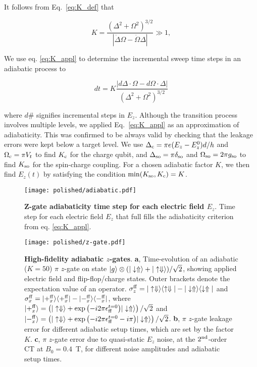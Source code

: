 It follows from Eq.~\ref{eq:K_def} that

\begin{equation} \label{eq:K_appl}
K=\frac{\left(\Delta^2+\Omega^2\right)^{3/2}}{|\dot{\Delta}\Omega-\dot{\Omega}\Delta|}\gg1,
\end{equation}

We use eq. \eqref{eq:K_appl} to determine the incremental sweep time steps in an adiabatic process to 

\begin{equation} \label{eq:dtK}
dt=K\frac{|d\Delta\cdot\Omega-d\Omega\cdot\Delta|}{\left(\Delta^2+\Omega^2\right)^{3/2}}
\end{equation}

where $d\#$ signifies incremental steps in $E_z$.
Although the transition process involves multiple levels, we applied Eq.~\ref{eq:K_appl} as an approximation of adiabaticity. This was confirmed to be always valid by checking that the leakage errors were kept below a target level.
We use $\Delta_{\rm c}=\pi e(E_z - E_z^0)d/h$ and $\Omega_{\rm c}=\pi V_t$ to find $K_{\rm c}$ for the charge qubit, and $\Delta_{\rm so}=\pi\delta_{\rm so}$ and $\Omega_{\rm so}=2\pi g_{\rm so}$ to find $K_{\rm so}$ for the spin-charge coupling.
 For a chosen adiabatic factor $K$, we then find $E_z(t)$ by satisfying the condition $\min(K_{\rm so},K_{\rm c})=K$.

\begin{figure}[h]
	\centering
	\texttt{[image: polished/adiabatic.pdf]}
	\label{fig:z-gate_K}
	\caption[Z-gate adiabaticity time step for each electric field $E_z$]{\textbf{Z-gate adiabaticity time step for each electric field $E_z$}. Time step for each electric field $E_z$ that full fills the adiabaticity criterion from eq. \eqref{eq:K_appl}.}
\end{figure}

\begin{figure}[h]
	\centering
	\texttt{[image: polished/z-gate.pdf]}
	\caption[High-fidelity adiabatic $z$-gates]{\textbf{High-fidelity adiabatic $z$-gates}.
		\textbf{a}, Time-evolution of an adiabatic  ($K=50$) $\pi$ $z$-gate on state $|g\rangle\otimes(|\downarrow\Uparrow\rangle+|\uparrow\Downarrow\rangle)/\sqrt{2}$, showing applied electric field and flip-flop/charge states. Outer brackets denote the expectation value of an operator. $\sigma_z^{\rm ff}=|\uparrow\Downarrow\rangle\langle \uparrow\Downarrow|-|\downarrow\Uparrow\rangle\langle \downarrow\Uparrow|$ and $\sigma_x^{\rm ff}=|+_x^{\rm ff}\rangle\langle +_x^{\rm ff}|-|-_x^{\rm ff}\rangle\langle -_x^{\rm ff}|$, where $|+_x^{\rm ff}\rangle=\left(|\uparrow\Downarrow\rangle+\exp{\left(-i2\pi\epsilon_{\rm ff}^{t=0}\right)}|\downarrow\Uparrow\rangle\right)/\sqrt{2}$ and $|-_x^{\rm ff}\rangle=\left(|\uparrow\Downarrow\rangle+\exp{\left(-i2\pi\epsilon_{\rm ff}^{t=0}-i\pi\right)}|\downarrow\Uparrow\rangle\right)/\sqrt{2}$. 
		\textbf{b}, $\pi$ $z$-gate leakage error for different adiabatic setup times, which are set by the factor $K$.
		\textbf{c}, $\pi$ $z$-gate error due to quasi-static $E_z$ noise, at the $2^{\rm nd}$-order CT at $B_0=0.4$~T, for different noise amplitudes and adiabatic setup times.}
	\label{fig:z-gate}
\end{figure}



